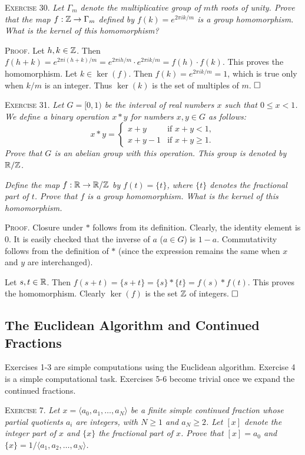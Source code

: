 \documentclass[11pt, leqno]{article}
\newcommand{\done}{\ensuremath{\hfill\square}}
\begin{document}
\textsc{Exercise 30}. \emph{Let $\Gamma_m$ denote the multiplicative group of $m$th roots of unity. Prove that the map $f: \mathbb{Z} \to \Gamma_m$ defined by $f(k) = e^{2\pi i k/m}$ is a group homomorphism. What is the kernel of this homomorphism?}

\textsc{Proof}. Let $h, k \in \mathbb{Z}$. Then $f(h+k) = e^{2\pi i (h+k)/m} = e^{2\pi i h/m}\cdot e^{2\pi i k/m} = f(h)\cdot f(k)$. This proves the homomorphism. Let $k\in \ker(f)$. Then $f(k) = e^{2\pi i k/m} = 1$, which is true only when $k/m$ is an integer. Thus $\ker(k)$ is the set of multiples of $m$. \done

\textsc{Exercise 31}. \emph{Let $G = [0,1)$ be the interval of real numbers $x$ such that $0\leq x < 1$. We define a binary operation $x*y$ for numbers $x,y\in G$ as follows: 
\begin{displaymath}
x*y =
\begin{cases}
  x + y & \text{if } x+y < 1,\\
  x + y - 1 & \text{if } x+y \geq 1.
\end{cases}
\end{displaymath}
Prove that $G$ is an abelian group with this operation. This group is denoted by $\mathbb{R}/\mathbb{Z}$.}

\emph{Define the map $f: \mathbb{R} \to \mathbb{R}/\mathbb{Z}$ by $f(t) = \{t\}$, where $\{t\}$ denotes the fractional part of $t$. Prove that $f$ is a group homomorphism. What is the kernel of this homomorphism.}

\textsc{Proof}. Closure under $*$ follows from its definition. Clearly, the identity element is $0$. It is easily checked that the inverse of $a$ ($a\in G$) is $1-a$. Commutativity follows from the definition of $*$ (since the expression remains the same when $x$ and $y$ are interchanged).

Let $s, t \in \mathbb{R}$. Then $f(s+t) = \{s + t\} = \{s\} * \{t\} = f(s)*f(t)$. This proves the homomorphism. Clearly $\ker(f)$ is the set $\mathbb{Z}$ of integers. \done

\subsection{The Euclidean Algorithm and Continued Fractions}

Exercises 1-3 are simple computations using the Euclidean algorithm. Exercise 4 is a simple computational task. Exercises 5-6 become trivial once we expand the continued fractions.

\textsc{Exercise 7}. \emph{Let $x=\langle a_0, a_1,\ldots,a_N \rangle$ be a finite simple continued fraction whose partial quotients $a_i$ are integers, with $N \geq 1$ and $a_N \geq 2$. Let $[x]$ denote the integer part of $x$ and $\{x\}$ the fractional part of $x$. Prove that $[x]=a_0$ and $\{x\} = 1/\langle a_1, a_2,\ldots,a_N \rangle$.}
\end{document}
